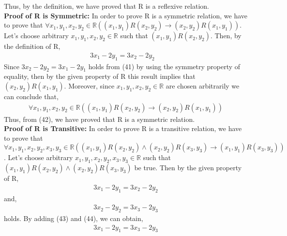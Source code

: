 \documentclass[12pt]{article}
\newcommand{\R}{\mathbb{R}}
\begin{document}
Thus, by the definition, we have proved that R is a reflexive relation.\\
\textbf{Proof of R is Symmetric:}
In order to prove R is a symmetric relation, we have to prove that $\forall x_{1},y_{1},x_{2},y_{2}\in \R ((x_{1},y_{1})R(x_{2},y_{2}) \rightarrow (x_{2},y_{2})R(x_{1},y_{1}))$. Let's choose arbitrary $ x_{1},y_{1},x_{2},y_{2}\in \R$ such that $(x_{1},y_{1})R(x_{2},y_{2})$. Then, by the definition of R,
\begin{equation}
\begin{split}
3x_{1}-2y_{1} = 3x_{2}-2y_{2}\quad
\end{split}
\end{equation}
Since $3x_{2}-2y_{2}=3x_{1}-2y_{1}$ holds from (41) by using the symmetry property of equality, then by the given property of R this result implies that $(x_{2},y_{2})R(x_{1},y_{1})$. Moreover, since $ x_{1},y_{1},x_{2},y_{2}\in \R$ are chosen arbitrarily we can conclude that,
\begin{equation}
\begin{split}
\forall x_{1},y_{1},x_{2},y_{2}\in \R ((x_{1},y_{1})R(x_{2},y_{2}) \rightarrow (x_{2},y_{2})R(x_{1},y_{1}))
\end{split}
\end{equation}
Thus, from (42), we have proved that R is a symmetric relation.\\
\textbf{Proof of R is Transitive:}
In order to prove R is a transitive relation, we have to prove that $\forall x_{1},y_{1},x_{2},y_{2},x_{3},y_{3}\in \R((x_{1},y_{1})R(x_{2},y_{2})\land(x_{2},y_{2})R(x_{3},y_{3})\rightarrow (x_{1},y_{1})R(x_{3},y_{3}))$. Let's choose arbitrary $ x_{1},y_{1},x_{2},y_{2},x_{3},y_{3}\in \R$ such that $(x_{1},y_{1})R(x_{2},y_{2})\land(x_{2},y_{2})R(x_{3},y_{3})$ be true. Then by the given property of R,
\begin{equation}
\begin{split}
3x_{1} -2y_{1} = 3x_{2} - 2y_{2}
\end{split}
\end{equation}
and,
\begin{equation}
\begin{split}
3x_{2} -2y_{2} = 3x_{3} - 2y_{3}
\end{split}
\end{equation}
holds. By adding (43) and (44), we can obtain,
\begin{equation}
\begin{split}
3x_{1} -2y_{1} = 3x_{3} - 2y_{3}
\end{split}
\end{equation}
\end{document}
